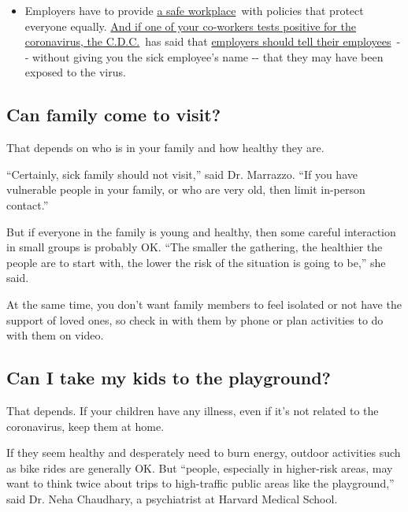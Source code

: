 \begin{itemize}
  \begin{itemize}
  \tightlist
  \item
    Employers have to provide
    \href{https://www.osha.gov/SLTC/covid-19/standards.html}{a safe
    workplace}~with policies that protect everyone equally.
    \href{https://www.nytimes3xbfgragh.onion/article/coronavirus-money-unemployment.html?action=click\&pgtype=Article\&state=default\&region=MAIN_CONTENT_3\&context=storylines_faq}{And
    if one of your co-workers tests positive for the coronavirus, the
    C.D.C.}~has said that
    \href{https://www.cdc.gov/coronavirus/2019-ncov/community/guidance-business-response.html}{employers
    should tell their employees}~-\/- without giving you the sick
    employee's name -\/- that they may have been exposed to the virus.
  \end{itemize}
\end{itemize}

\hypertarget{can-family-come-to-visit}{%
\subsection{Can family come to visit?}\label{can-family-come-to-visit}}

That depends on who is in your family and how healthy they are.

``Certainly, sick family should not visit,'' said Dr. Marrazzo. ``If you
have vulnerable people in your family, or who are very old, then limit
in-person contact.''

But if everyone in the family is young and healthy, then some careful
interaction in small groups is probably OK. ``The smaller the gathering,
the healthier the people are to start with, the lower the risk of the
situation is going to be,'' she said.

At the same time, you don't want family members to feel isolated or not
have the support of loved ones, so check in with them by phone or plan
activities to do with them on video.

\hypertarget{can-i-take-my-kids-to-the-playground}{%
\subsection{Can I take my kids to the
playground?}\label{can-i-take-my-kids-to-the-playground}}

That depends. If your children have any illness, even if it's not
related to the coronavirus, keep them at home.

If they seem healthy and desperately need to burn energy, outdoor
activities such as bike rides are generally OK. But ``people, especially
in higher-risk areas, may want to think twice about trips to
high-traffic public areas like the playground,'' said Dr. Neha
Chaudhary, a psychiatrist at Harvard Medical School.

